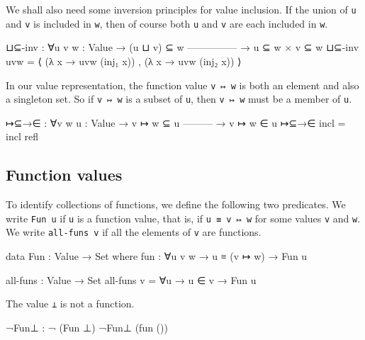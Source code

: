 We shall also need some inversion principles for value inclusion. If the
union of \texttt{u} and \texttt{v} is included in \texttt{w}, then of
course both \texttt{u} and \texttt{v} are each included in \texttt{w}.

\begin{fence}
\begin{code}
⊔⊆-inv : ∀{u v w : Value}
       → (u ⊔ v) ⊆ w
         ---------------
       → u ⊆ w  ×  v ⊆ w
⊔⊆-inv uvw = ⟨ (λ x → uvw (inj₁ x)) , (λ x → uvw (inj₂ x)) ⟩
\end{code}
\end{fence}

In our value representation, the function value \texttt{v\ ↦\ w} is both
an element and also a singleton set. So if \texttt{v\ ↦\ w} is a subset
of \texttt{u}, then \texttt{v\ ↦\ w} must be a member of \texttt{u}.

\begin{fence}
\begin{code}
↦⊆→∈ : ∀{v w u : Value}
     → v ↦ w ⊆ u
       ---------
     → v ↦ w ∈ u
↦⊆→∈ incl = incl refl
\end{code}
\end{fence}

\hypertarget{function-values}{%
\subsection{Function values}\label{function-values}}

To identify collections of functions, we define the following two
predicates. We write \texttt{Fun\ u} if \texttt{u} is a function value,
that is, if \texttt{u\ ≡\ v\ ↦\ w} for some values \texttt{v} and
\texttt{w}. We write \texttt{all-funs\ v} if all the elements of
\texttt{v} are functions.

\begin{fence}
\begin{code}
data Fun : Value → Set where
  fun : ∀{u v w} → u ≡ (v ↦ w) → Fun u

all-funs : Value → Set
all-funs v = ∀{u} → u ∈ v → Fun u
\end{code}
\end{fence}

The value \texttt{⊥} is not a function.

\begin{fence}
\begin{code}
¬Fun⊥ : ¬ (Fun ⊥)
¬Fun⊥ (fun ())
\end{code}
\end{fence}

